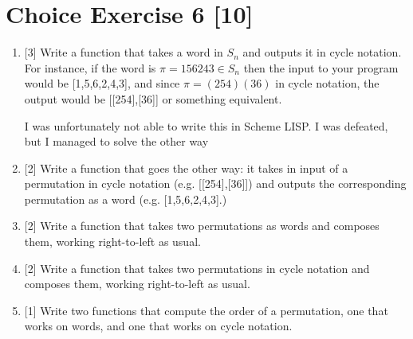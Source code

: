 \documentclass{article}
\begin{document}
\section*{Choice Exercise 6 [10]}
\begin{enumerate}
    \item {
        [3] Write a function that takes a word in \(S_n\) and outputs it in cycle notation. For instance, if the word is \(\pi = 156243 \in S_n\) then the input to your program would be [1,5,6,2,4,3], and since \(\pi = (254)(36)\) in cycle notation, the output would be [[254],[36]] or something equivalent.

        

        I was unfortunately not able to write this in Scheme LISP. I was 
        defeated, but I managed to solve the other way
    }

    \item {
        [2] Write a function that goes the other way: it takes in input of a permutation in cycle notation (e.g. [[254],[36]]) and outputs the corresponding permutation as a word (e.g. [1,5,6,2,4,3].)

        
    }

    \item {
        [2] Write a function that takes two permutations as words and composes them, working right-to-left as usual.
    

        
    }

    \item {
        [2] Write a function that takes two permutations in cycle notation and composes them, working right-to-left as usual.

        
    }

    \item {
        [1] Write two functions that compute the order of a permutation, one that works on words, and one that works on cycle notation.

        

    }
\end{enumerate}
\end{document}
